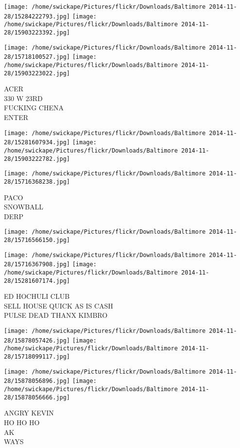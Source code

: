 \documentclass[10pt,letterpaper]{article}
\begin{document}
\texttt{[image: /home/swickape/Pictures/flickr/Downloads/Baltimore 2014-11-28/15284222793.jpg]}
\texttt{[image: /home/swickape/Pictures/flickr/Downloads/Baltimore 2014-11-28/15903223392.jpg]}

\texttt{[image: /home/swickape/Pictures/flickr/Downloads/Baltimore 2014-11-28/15718100527.jpg]}
\texttt{[image: /home/swickape/Pictures/flickr/Downloads/Baltimore 2014-11-28/15903223022.jpg]}

ACER\\
330 W 23RD\\
FUCKING CHENA\\
ENTER
\pagebreak

\texttt{[image: /home/swickape/Pictures/flickr/Downloads/Baltimore 2014-11-28/15281607934.jpg]}
\texttt{[image: /home/swickape/Pictures/flickr/Downloads/Baltimore 2014-11-28/15903222782.jpg]}

\texttt{[image: /home/swickape/Pictures/flickr/Downloads/Baltimore 2014-11-28/15716368238.jpg]}

PACO\\
SNOWBALL\\
DERP
\pagebreak

\texttt{[image: /home/swickape/Pictures/flickr/Downloads/Baltimore 2014-11-28/15716566150.jpg]}

\vspace{0.25in}
\texttt{[image: /home/swickape/Pictures/flickr/Downloads/Baltimore 2014-11-28/15716367908.jpg]}
\texttt{[image: /home/swickape/Pictures/flickr/Downloads/Baltimore 2014-11-28/15281607174.jpg]}

ED HOCHULI CLUB\\
SELL HOUSE QUICK AS IS CASH\\
PULSE DEAD THANX KIMBRO
\pagebreak

\texttt{[image: /home/swickape/Pictures/flickr/Downloads/Baltimore 2014-11-28/15878057426.jpg]}
\texttt{[image: /home/swickape/Pictures/flickr/Downloads/Baltimore 2014-11-28/15718099117.jpg]}

\texttt{[image: /home/swickape/Pictures/flickr/Downloads/Baltimore 2014-11-28/15878056896.jpg]}
\texttt{[image: /home/swickape/Pictures/flickr/Downloads/Baltimore 2014-11-28/15878056666.jpg]}

ANGRY KEVIN\\
HO HO HO\\
AK\\
WAYS
\pagebreak
\end{document}
